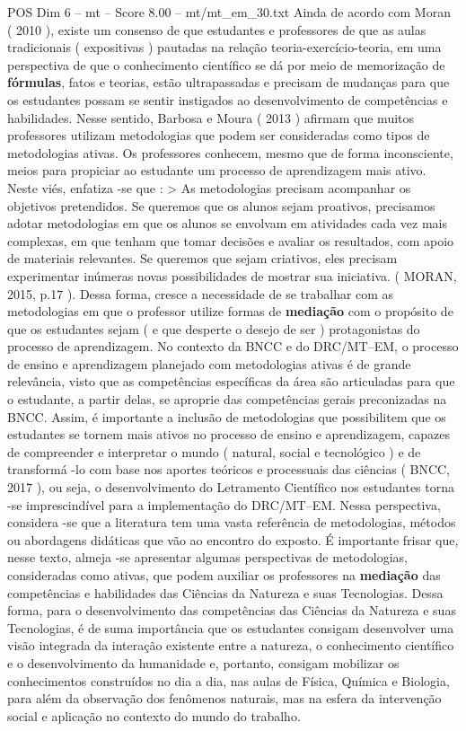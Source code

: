 \begin{textsample}{POS Dim 6 – mt – Score 8.00 – mt/mt\_em\_30.txt}
Ainda de acordo com Moran ( 2010 ), existe um consenso de que estudantes e professores de que as aulas tradicionais ( expositivas ) pautadas na relação teoria-exercício-teoria, em uma perspectiva de que o conhecimento científico se dá por meio de memorização de \textbf{fórmulas}, fatos e teorias, estão ultrapassadas e precisam de mudanças para que os estudantes possam se sentir instigados ao desenvolvimento de competências e habilidades.
Nesse sentido, Barbosa e Moura ( 2013 ) afirmam que muitos professores utilizam metodologias que podem ser consideradas como tipos de metodologias ativas.
Os professores conhecem, mesmo que de forma inconsciente, meios para propiciar ao estudante um processo de aprendizagem mais ativo.
Neste viés, enfatiza -se que : > As metodologias precisam acompanhar os objetivos pretendidos.
Se queremos que os alunos sejam proativos, precisamos adotar metodologias em que os alunos se envolvam em atividades cada vez mais complexas, em que tenham que tomar decisões e avaliar os resultados, com apoio de materiais relevantes.
Se queremos que sejam criativos, eles precisam experimentar inúmeras novas possibilidades de mostrar sua iniciativa. ( MORAN, 2015, p.17 ).
Dessa forma, cresce a necessidade de se trabalhar com as metodologias em que o professor utilize formas de \textbf{mediação} com o propósito de que os estudantes sejam ( e que desperte o desejo de ser ) protagonistas do processo de aprendizagem.
No contexto da BNCC e do DRC/MT–EM, o processo de ensino e aprendizagem planejado com metodologias ativas é de grande relevância, visto que as competências específicas da área são articuladas para que o estudante, a partir delas, se aproprie das competências gerais preconizadas na BNCC.
Assim, é importante a inclusão de metodologias que possibilitem que os estudantes se tornem mais ativos no processo de ensino e aprendizagem, capazes de compreender e interpretar o mundo ( natural, social e tecnológico ) e de transformá -lo com base nos aportes teóricos e processuais das ciências ( BNCC, 2017 ), ou seja, o desenvolvimento do Letramento Científico nos estudantes torna -se imprescindível para a implementação do DRC/MT–EM.
Nessa perspectiva, considera -se que a literatura tem uma vasta referência de metodologias, métodos ou abordagens didáticas que vão ao encontro do exposto.
É importante frisar que, nesse texto, almeja -se apresentar algumas perspectivas de metodologias, consideradas como ativas, que podem auxiliar os professores na \textbf{mediação} das competências e habilidades das Ciências da Natureza e suas Tecnologias.
Dessa forma, para o desenvolvimento das competências das Ciências da Natureza e suas Tecnologias, é de suma importância que os estudantes consigam desenvolver uma visão integrada da interação existente entre a natureza, o conhecimento científico e o desenvolvimento da humanidade e, portanto, consigam mobilizar os conhecimentos construídos no dia a dia, nas aulas de Física, Química e Biologia, para além da observação dos fenômenos naturais, mas na esfera da intervenção social e aplicação no contexto do mundo do trabalho.

\end{textsample}

